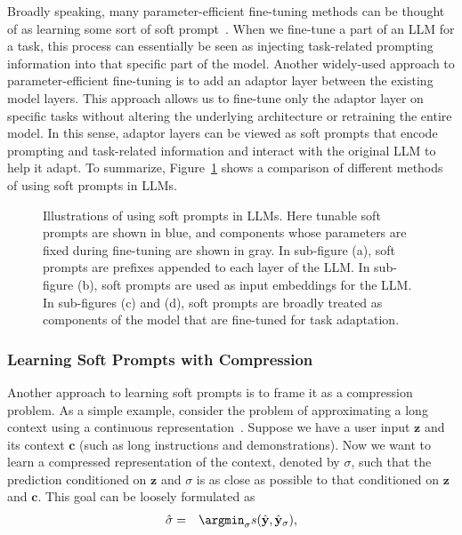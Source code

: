 Broadly speaking, many parameter-efficient fine-tuning methods can be thought of as learning some sort of soft prompt~\cite{lialin-etal:2023scaling}. When we fine-tune a part of an LLM for a task, this process can essentially be seen as injecting task-related prompting information into that specific part of the model. Another widely-used approach to parameter-efficient fine-tuning is to add an adaptor layer between the existing model layers. This approach allows us to fine-tune only the adaptor layer on specific tasks without altering the underlying architecture or retraining the entire model. In this sense, adaptor layers can be viewed as soft prompts that encode prompting and task-related information and interact with the original LLM to help it adapt. To summarize, Figure~\ref{fig:comparison-of-soft-prompts-in-llms} shows a comparison of different methods of using soft prompts in LLMs.

\begin{figure}[!t]
\centering

\caption{Illustrations of using soft prompts in LLMs. Here tunable soft prompts are shown in blue, and components whose parameters are fixed during fine-tuning are shown in gray. In sub-figure (a), soft prompts are prefixes appended to each layer of the LLM. In sub-figure (b), soft prompts are used as input embeddings for the LLM. In sub-figures (c) and (d), soft prompts are broadly treated as components of the model that are fine-tuned for task adaptation.}
\label{fig:comparison-of-soft-prompts-in-llms}
\end{figure}

\subsubsection{Learning Soft Prompts with Compression}

\noindent Another approach to learning soft prompts is to frame it as a compression problem. As a simple example, consider the problem of approximating a long context using a continuous representation~\cite{wingate-etal:2022prompt}. Suppose we have a user input $\mathbf{z}$ and its context $\mathbf{c}$ (such as long instructions and demonstrations). Now we want to learn a compressed representation of the context, denoted by $\sigma$, such that the prediction conditioned on $\mathbf{z}$ and $\sigma$
is as close as possible to that conditioned on $\mathbf{z}$ and $\mathbf{c}$. This goal can be loosely formulated as
\begin{eqnarray}
\hat{\sigma} & = & \argmin_{\sigma} s(\hat{\mathbf{y}},\hat{\mathbf{y}}_{\sigma}),
\end{eqnarray}

